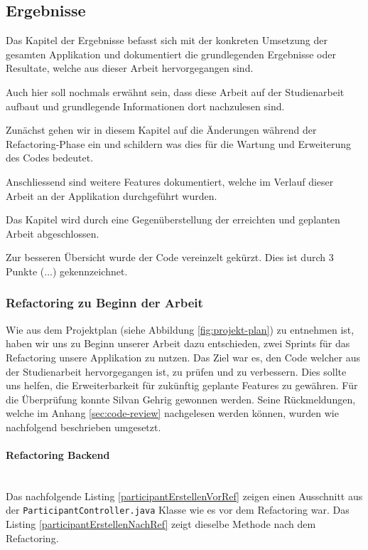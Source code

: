 \subsection{Ergebnisse}
Das Kapitel der Ergebnisse befasst sich mit der konkreten Umsetzung der gesamten Applikation und dokumentiert die grundlegenden Ergebnisse oder Resultate, welche aus dieser Arbeit hervorgegangen sind. 

Auch hier soll nochmals erwähnt sein, dass diese Arbeit auf der Studienarbeit \cite{methode635-sa} aufbaut und grundlegende Informationen dort nachzulesen sind. 

Zunächst gehen wir in diesem Kapitel auf die Änderungen während der Refactoring-Phase ein und schildern was dies für die Wartung und Erweiterung des Codes bedeutet. 

Anschliessend sind weitere Features dokumentiert, welche im Verlauf dieser Arbeit an der Applikation durchgeführt wurden.

Das Kapitel wird durch eine Gegenüberstellung der erreichten und geplanten Arbeit abgeschlossen.

Zur besseren Übersicht wurde der Code vereinzelt gekürzt. Dies ist durch 3 Punkte (...) gekennzeichnet.

\subsubsection{Refactoring zu Beginn der Arbeit}
Wie aus dem Projektplan (siehe Abbildung \ref{fig:projekt-plan}) zu entnehmen ist, haben wir uns zu Beginn unserer Arbeit dazu entschieden, zwei Sprints für das Refactoring unsere Applikation zu nutzen. Das Ziel war es, den Code welcher aus der Studienarbeit hervorgegangen ist, zu prüfen und zu verbessern. Dies sollte uns helfen, die Erweiterbarkeit für zukünftig geplante Features zu gewähren. Für die Überprüfung konnte Silvan Gehrig gewonnen werden. Seine Rückmeldungen, welche im Anhang \ref{sec:code-review} nachgelesen werden können, wurden wie nachfolgend beschrieben umgesetzt.
 
\paragraph*{Refactoring Backend}~\\
Das nachfolgende Listing \ref{participantErstellenVorRef} zeigen einen Ausschnitt aus der \texttt{Participant\-Controller\-.java} Klasse wie es vor dem Refactoring war. Das Listing \ref{participantErstellenNachRef} zeigt dieselbe Methode nach dem Refactoring.

